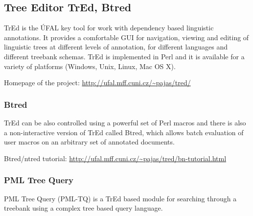 %

\subsection{Tree Editor TrEd, Btred}

TrEd is the ÚFAL key tool for work with dependency based linguistic annotations. It provides a comfortable GUI for navigation, viewing and editing of linguistic trees at different levels of annotation, for different languages and different treebank schemas. TrEd is implemented in Perl and it is available for a variety of platforms (Windows, Unix, Linux, Mac OS X).

\medskip
Homepage of the project: \url{http://ufal.mff.cuni.cz/~pajas/tred/}


\subsubsection{Btred}
TrEd can be also controlled using a powerful set of Perl macros and there is also a non-interactive version of TrEd called Btred, which allows batch evaluation of user macros on an arbitrary set of annotated documents.

\medskip
Btred/ntred tutorial: \url{http://ufal.mff.cuni.cz/~pajas/tred/bn-tutorial.html}


\subsubsection{PML Tree Query} \label{sec:ch30_pml_tree_query}
PML Tree Query (PML-TQ) \citep{biblio:PaStSystemfor2009} is a TrEd based module for searching through a treebank using a complex tree based query language.

